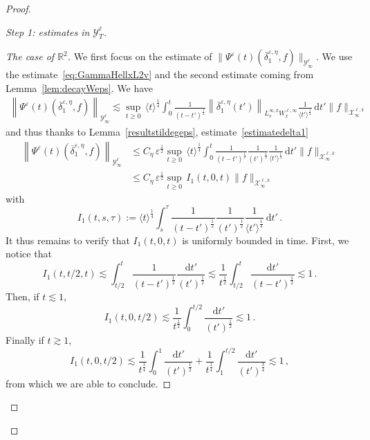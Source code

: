 \documentclass[11pt]{article}
\theoremstyle{definition}
\numberwithin{equation}{section}
\numberwithin{figure}{section}
\numberwithin{table}{section}
\newcommand*{\dd}{\mathrm{d}}
\newcommand*{\dt}{\dd t}
\newenvironment{step}[1]{\begin{proof}[#1]}{\let\qed\relax\end{proof}}
\newcommand*\R {\mathbb{R}}
\newcommand*\eps{{\varepsilon}}
\begin{document}
\begin{proof}
\begin{step}{Step 1: estimates in $\mathcal{Y}^\ell_T$}
\begin{step}{The case of $\R^2$}
We first focus on the estimate of $\|\Psi^\eps(t) (\overline \delta^{\eps,\eta}_1, f)\|_{\mathcal{Y}^\ell_\infty}$. We use the estimate~\eqref{eq:GammaHellxL2v} and the second estimate coming from Lemma~\ref{lem:decayWeps}. We have
\begin{align*}
\left\|\Psi^\eps(t) (\overline \delta^{\eps,\eta}_1,f)\right\|_{\mathcal{Y}^\ell_\infty} \lesssim \sup_{t \ge 0} \, \langle t \rangle^\frac{1}{4} \int_0^t \frac{1}{{(t-t')^\frac{1}{2}}} \left\|\overline \delta^{\eps,\eta}_1(t')\right\|_{L^{\infty,k}_vW^{\ell,\infty}_x} \frac{1}{\langle t' \rangle^\frac{1}{4}} \, \dt' \|f\|_{\mathcal{X}^{\ell,k}_\infty}
\end{align*}
and thus thanks to Lemma~\ref{resultstildegeps}, estimate~\eqref{estimatedelta1}
\begin{align*}
\left\|\Psi^\eps(t) (\overline \delta^{\eps,\eta}_1, f)\right\|_{\mathcal{Y}^\ell_\infty} &\le C_\eta \, \eps^\frac{1}{2} \sup_{t \ge 0} \, \langle t \rangle^\frac{1}{4} \int_0^t \frac{1}{{(t-t')^\frac{1}{2}}} \frac{1}{(t')^\frac{1}{2}} \frac{1}{\langle t' \rangle^\frac{1}{4}} \, \dt' \|f\|_{\mathcal{X}^{\ell,k}_\infty} \\
&\le C_\eta \, \eps^\frac{1}{2} \sup_{t \ge 0} \, I_1(t,0,t) \|f\|_{\mathcal{X}^{\ell,k}_\infty}
\end{align*}
with
\[
I_1(t,s,\tau) := \langle t \rangle^\frac{1}{4} \int_s^\tau \frac{1}{{(t-t')^\frac{1}{2}}} \frac{1}{(t')^\frac{1}{2}} \frac{1}{\langle t' \rangle^\frac{1}{4}} \, \dt' \,.
\]
It thus remains to verify that $I_1(t,0,t)$ is uniformly bounded in time. First, we notice that
\[
I_1(t,t/2,t)
\lesssim \int_{t/2}^t \frac{1}{{(t-t')^\frac{1}{2}}} \frac{\dt'}{(t')^\frac{1}{2}} \lesssim \frac{1}{t^\frac{1}{2}} \int_{t/2}^t \frac{\dt'}{{(t-t')^\frac{1}{2}}} \lesssim 1 \,.
\]
Then, if $t \lesssim 1$,
\[
I_1(t,0,t/2)
\lesssim \frac{1}{t^\frac{1}{2}} \int_0^{t/2} \frac{\dt'}{(t')^\frac{1}{2}} \lesssim 1 \,.
\]
Finally if $t \gtrsim 1$,
\[
I_1(t,0,t/2)
\lesssim \frac{1}{t^\frac{1}{4}} \int_0^1 \frac{\dt'}{(t')^\frac{1}{2}} + \frac{1}{t^\frac{1}{4}} \int_1^{t/2} \frac{\dt'}{(t')^\frac{3}{4}} \lesssim 1 \,,
\]
from which we are able to conclude.


\end{step}
\end{step}
\end{proof}
\end{document}

